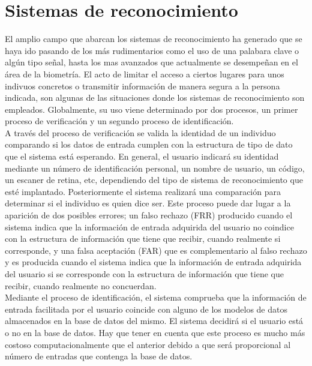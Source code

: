 
\section{Sistemas de reconocimiento}

El amplio campo que abarcan los sistemas de reconocimiento ha generado que se haya ido pasando de los más rudimentarios como el uso de una palabara clave o algún tipo señal, hasta los mas avanzados que actualmente se desempeñan en el área de la biometría. El acto de limitar el acceso a ciertos lugares para unos indivuos concretos o transmitir información de manera segura a la persona indicada, son algunas de las situaciones donde los sistemas de reconocimiento son empleados. Globalmente, su uso viene determinado por dos procesos, un primer proceso de verificación y un segundo proceso de identificación. \\

A través del proceso de verificación se valida la identidad de un individuo comparando si los datos de entrada cumplen con la estructura de tipo de dato que el sistema está esperando. En general, el usuario indicará su identidad mediante un número de identificación personal, un nombre de usuario, un código, un escaner de retina, etc, dependiendo del tipo de sistema de reconocimiento que esté implantado. Posteriormente el sistema realizará una comparación para determinar si el individuo es quien dice ser. Este proceso puede dar lugar a la aparición de dos posibles errores; un falso rechazo (FRR) producido cuando el sistema indica que la información de entrada adquirida del usuario no coindice con la estructura de información que tiene que recibir, cuando realmente si corresponde, y una falsa aceptación (FAR) que es complementario al falso rechazo y es producida cuando el sistema indica que la información de entrada adquirida del usuario si se corresponde con la estructura de información que tiene que recibir, cuando realmente no concuerdan.  \\

Mediante el proceso de identificación, el sistema comprueba que la información de entrada facilitada por el usuario coincide con alguno de los modelos de datos almacenados en la base de datos del mismo. El sistema decidirá si el usuario está o no en la base de datos. Hay que tener en cuenta que este proceso es mucho más costoso computacionalmente que el anterior debido a que será proporcional al número de entradas que contenga la base de datos. \\

